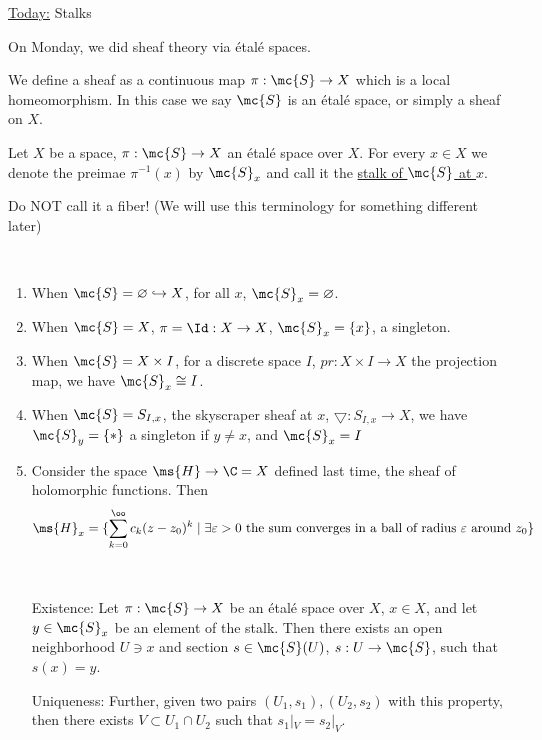 \documentclass[x11names,reqno,14pt]{extarticle}
\newcommand{\into}{\hookrightarrow}
\begin{document}
\underline{Today:} Stalks

On Monday, we did sheaf theory via \'etal\'e spaces. 

We define a sheaf as a continuous map $\pi:\mc{S}\to X$ which is a local homeomorphism. In this case we say $\mc{S}$ is an \'etal\'e space, or simply a sheaf on $X$.


Let $X$ be a space, $\pi:\mc{S}\to X$ an \'etal\'e space over $X$. For every $x \in X$ we denote the preimae $\pi^{-1}(x)$ by $\mc{S}_x$ and call it the \underline{stalk of $\mc{S}$ at $x$}.

Do NOT call it a fiber! (We will use this terminology for something different later)

\exm
\,
\begin{enumerate}

\item When $\mc{S} = \varnothing \into X$, for all $x$, $\mc{S}_x = \varnothing$. 

\item When $\mc{S} = X$, $\pi= \Id:X\to X$, $\mc{S}_x = \{x\}$, a singleton. 

\item When $\mc{S} = X\times I$, for a discrete space $I$, $pr:X\times I \to X$ the projection map, we have $\mc{S}_x \cong I$.

\item When $\mc{S} = S_{I,x}$, the skyscraper sheaf at $x$, $\bigtriangledown: S_{I,x} \to X$, we have $\mc{S}_y = \{*\}$ a singleton if $y \neq x$, and $\mc{S}_x = I$

\item Consider the space $\ms{H}\to \C = X$ defined last time, the sheaf of holomorphic functions. Then 
\[
\ms{H}_x = \{\sum_{k=0}^\oo c_k(z-z_0)^k \mid \exists \varepsilon>0\text{ the sum converges in a ball of radius }\varepsilon\text{ around }z_0\}
\]

\end{enumerate}

\lem
\,
\begin{itemize}

\item[Existence:] Let $\pi:\mc{S}\to X$ be an \'etal\'e space over $X$, $x \in X$, and let $y \in \mc{S}_x$ be an element of the stalk. Then there exists an open neighborhood $U \ni x$ and section $s \in \mc{S}(U)$, $s:U\to\mc{S}$, such that $s(x) = y$.

\item[Uniqueness:] Further, given two pairs $(U_1, s_1),(U_2,s_2)$ with this property, then there exists $V \subset U_1 \cap U_2$ such that $s_1|_V = s_2|_V$.

\end{itemize}
\end{document}
